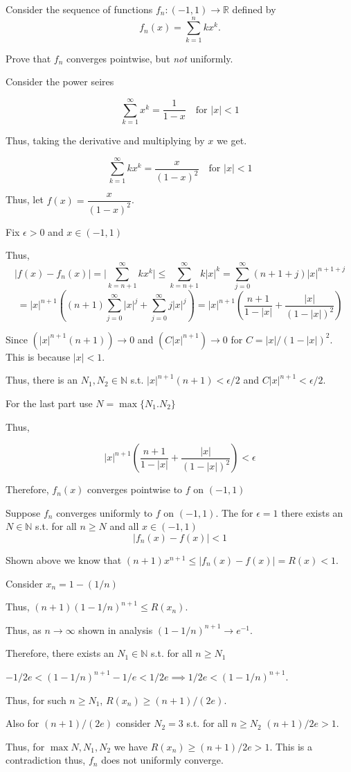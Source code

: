 \documentclass[12pt, letterpaper]{article}
\newcommand{\R}{\mathbb{R}}
\newcommand{\N}{\mathbb{N}}
\renewcommand{\t}[1]{\text{#1}}
\begin{document}
\begin{problem}{}
    Consider the sequence of functions $f_n:(-1, 1) \to \R$ defined by
  \[
    f_n(x) = \sum_{k=1}^n kx^k.
  \]
\end{problem}

\begin{subproblem}{}
    Prove that $f_n$ converges pointwise, but \emph{not}
    uniformly.
\end{subproblem}
\begin{problemproof}
    Consider the power seires

    \[\sum_{k=1}^\infty x^k = \dfrac{1}{1-x} \quad \t{for } |x| < 1\]

    Thus, taking the derivative and multiplying by $x$ we get.

    \[\sum_{k=1}^\infty kx^k = \dfrac{x}{(1-x)^2} \quad \t{for } |x| < 1\]

    Thus, let $f(x)=\dfrac{x}{(1-x)^2}$.

    Fix $\epsilon > 0$ and $x \in (-1,1)$

    Thus, \[|f(x)-f_n(x)|=\lvert \sum_{k=n+1}^\infty kx^k \rvert \leq \sum_{k=n+1}^\infty k|x|^k = \sum_{j=0}^\infty (n+1+j)|x|^{n+1+j}\]
    \[=|x|^{n+1}((n+1) \sum_{j=0}^\infty|x|^j + \sum_{j=0}^\infty j|x|^j)=|x|^{n+1}\left(\dfrac{n+1}{1-|x|} + \dfrac{|x|}{(1-|x|)^2}\right)\]

    Since $(|x|^{n+1}(n+1)) \to 0$ and $(C|x|^{n+1}) \to 0$ for $C=|x|/(1-|x|)^2$. This is because $|x| < 1$.

    Thus, there is an $N_1,N_2 \in \N$ s.t. $|x|^{n+1}(n+1) < \epsilon/2$ and $C|x|^{n+1} < \epsilon/2$.

    For the last part use $N=\max\{N_1.N_2\}$

    Thus,

    \[|x|^{n+1}\left(\dfrac{n+1}{1-|x|} + \dfrac{|x|}{(1-|x|)^2}\right) < \epsilon\]

    Therefore, $f_n(x)$ converges pointwise to $f$ on $(-1,1)$

    Suppose $f_n$ converges uniformly to $f$ on $(-1,1)$. The for $\epsilon =1$ there exists an $N \in \N$ s.t. for all $n \geq N$ and all $x \in (-1,1)$
    \[|f_n(x)-f(x)| <1\]

    Shown above we know that $(n+1)x^{n+1} \leq |f_n(x)-f(x)|=R(x) < 1$.

    Consider $x_n=1-(1/n)$

    Thus, $(n+1)(1-1/n)^{n+1} \leq R(x_n)$.

    Thus, as $n \to \infty$ shown in analysis $(1-1/n)^{n+1} \to e^{-1}$.

    Therefore, there exists an $N_1 \in \N$ s.t. for all $n \geq N_1$ 
    
    $-1/2e < (1-1/n)^{n+1}-1/e < 1/2e \implies 1/2e < (1-1/n)^{n+1}$.

    Thus, for such $n \geq N_1$, $R(x_n) \geq (n+1)/(2e)$.

    Also for $(n+1)/(2e)$ consider $N_2=3$ s.t. for all $n \geq N_2$ $(n+1)/2e > 1$.

    Thus, for $\max{N,N_1,N_2}$ we have $R(x_n) \geq (n+1)/2e > 1$. This is a contradiction thus, $f_n$ does not uniformly converge.
\end{problemproof}
\end{document}
